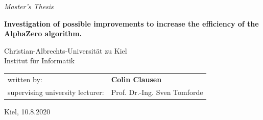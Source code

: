 \documentclass[12pt,onecolumn,oneside,titlepage]{article}
\begin{document}

\begin{center}
{\huge \it Master's Thesis}

\thispagestyle{empty}

\vspace{2cm}

{\Large \bf Investigation of possible improvements to increase the efficiency of the AlphaZero algorithm.}

\vspace{2.25cm}

\vspace{2.25cm}

{\large 
Christian-Albrechts-Universität zu Kiel \\
Institut für Informatik  \\
}

\end{center}

\vspace{2cm}

\begin{tabular}{ll}
written by:             & {\bf Colin Clausen} \\
supervising university lecturer: & Prof. Dr.-Ing. Sven Tomforde \\%
\end{tabular}

\vspace{1cm}

\begin{center}
Kiel, 10.8.2020
\end{center}


\pagebreak

\newpage\null\thispagestyle{empty}\newpage



\vspace{1.5cm}
\end{document}
